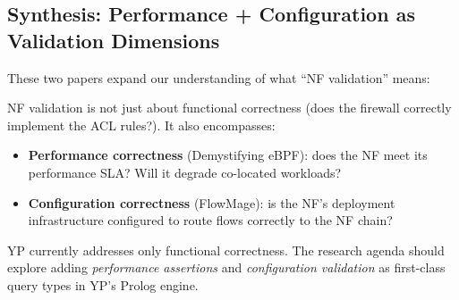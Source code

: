\subsection{Synthesis: Performance + Configuration as Validation Dimensions}

These two papers expand our understanding of what ``NF validation'' means:

\begin{insightbox}
NF validation is not just about functional correctness (does the firewall correctly implement the ACL rules?). It also encompasses:
\begin{itemize}
  \item \textbf{Performance correctness} (Demystifying eBPF): does the NF meet its performance SLA? Will it degrade co-located workloads?
  \item \textbf{Configuration correctness} (FlowMage): is the NF's deployment infrastructure configured to route flows correctly to the NF chain?
\end{itemize}
YP currently addresses only functional correctness. The research agenda should explore adding \emph{performance assertions} and \emph{configuration validation} as first-class query types in YP's Prolog engine.
\end{insightbox}
